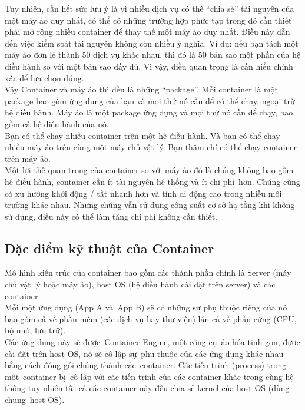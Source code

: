 \documentclass[12pt,a4paper]{report}
\begin{document}
		Tuy nhiên, cần hết sức lưu ý là vì nhiều dịch vụ có thể “chia sẻ” tài nguyên của một máy ảo duy nhất, có thể có những trường hợp phức tạp trong đó cần thiết phải mở rộng nhiều container để thay thế một máy ảo duy nhất. Điều này dẫn đến việc kiểm soát tài nguyên không còn nhiều ý nghĩa. Ví dụ: nếu bạn tách một máy ảo đơn lẻ thành 50 dịch vụ khác nhau, thì đó là 50 bản sao một phần của hệ điều hành so với một bản sao đầy đủ. Vì vậy, điều quan trọng là cần hiểu chính xác để lựa chọn đúng.\\
		
		Vậy Container và máy ảo thì đều là những “package”. Mỗi container là một package bao gồm ứng dụng của bạn và mọi thứ nó cần để có thể chạy, ngoại trừ hệ điều hành. Máy ảo là một package ứng dụng và mọi thứ nó cần để chạy, bao gồm cả hệ điều hành của nó.\\
		
		Bạn có thể chạy nhiều container trên một hệ điều hành. Và bạn có thể chạy nhiều máy ảo trên cùng một máy chủ vật lý. Bạn thậm chí có thể chạy container trên máy ảo.\\
		
		Một lợi thế quan trọng của container so với máy ảo đó là chúng không bao gồm hệ điều hành, container cần ít tài nguyên hệ thống và ít chi phí hơn. Chúng cũng có xu hướng khởi động / tắt nhanh hơn và tính di động cao trong nhiều môi trường khác nhau. Nhưng chúng vẫn sử dụng công suất cơ sở hạ tầng khi không sử dụng, điều này có thể làm tăng chi phí không cần thiết.
		\subsection{Đặc điểm kỹ thuật của Container}
		\hspace{0.6cm}Mô hình kiến trúc của container bao gồm các thành phần chính là Server (máy chủ vật lý hoặc máy ảo), host OS (hệ điều hành cài đặt trên server) và các container.\\
		
		Mỗi một ứng dụng (App A và App B) sẽ có những sự phụ thuộc riêng của nó bao gồm cả về phần mềm (các dịch vụ hay thư viện) lẫn cả về phần cứng (CPU, bộ nhớ, lưu trữ).\\
		
		Các ứng dụng này sẽ được Container Engine, một công cụ ảo hóa tinh gọn, được cài đặt trên host OS, nó sẽ cô lập sự phụ thuộc của các ứng dụng khác nhau bằng cách đóng gói chúng thành các container. Các tiến trình (process) trong một container bị cô lập với các tiến trình của các container khác trong cùng hệ thống tuy nhiên tất cả các container này đều chia sẻ kernel của host OS (dùng chung host OS).\\
		
\end{document}
